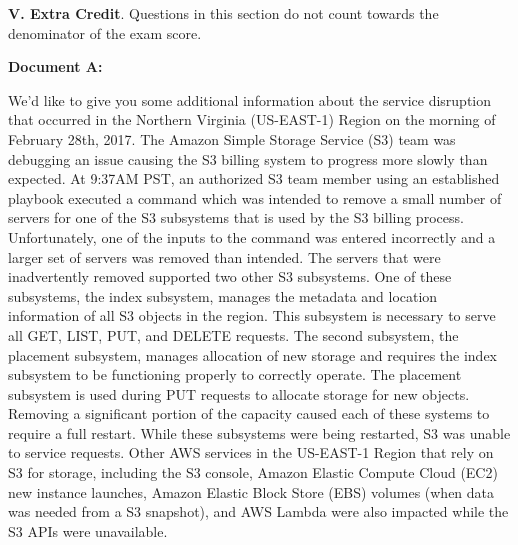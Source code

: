 \documentclass{report}
\begin{document}
\begin{spacing}{1.4}
\begin{enumerate}[leftmargin=*]
    \newpage
    
    \textbf{V. Extra Credit}. Questions in this section do not count towards the denominator of the exam score.

    \newpage

    \textbf{Document A:}
    
      We’d like to give you some additional information about the service disruption that occurred in the Northern Virginia (US-EAST-1) Region on the morning of February 28th, 2017. The Amazon Simple Storage Service (S3) team was debugging an issue causing the S3 billing system to progress more slowly than expected. At 9:37AM PST, an authorized S3 team member using an established playbook executed a command which was intended to remove a small number of servers for one of the S3 subsystems that is used by the S3 billing process. Unfortunately, one of the inputs to the command was entered incorrectly and a larger set of servers was removed than intended. The servers that were inadvertently removed supported two other S3 subsystems.  One of these subsystems, the index subsystem, manages the metadata and location information of all S3 objects in the region. This subsystem is necessary to serve all GET, LIST, PUT, and DELETE requests. The second subsystem, the placement subsystem, manages allocation of new storage and requires the index subsystem to be functioning properly to correctly operate. The placement subsystem is used during PUT requests to allocate storage for new objects. Removing a significant portion of the capacity caused each of these systems to require a full restart. While these subsystems were being restarted, S3 was unable to service requests. Other AWS services in the US-EAST-1 Region that rely on S3 for storage, including the S3 console, Amazon Elastic Compute Cloud (EC2) new instance launches, Amazon Elastic Block Store (EBS) volumes (when data was needed from a S3 snapshot), and AWS Lambda were also impacted while the S3 APIs were unavailable.


\end{enumerate}
\end{spacing}
\end{document}
